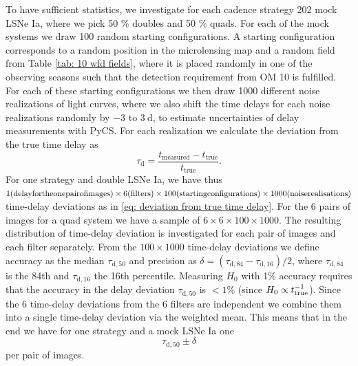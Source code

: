 To have sufficient statistics, we investigate for each cadence
strategy 202 mock LSNe Ia, where we pick 50 \% doubles and 50 \%
quads. For each of the mock systems we draw 100 random starting
configurations. A starting configuration corresponds to a random
position in the microlensing map and a random field from Table
\ref{tab: 10 wfd fields}, where it is placed randomly in one of the
observing seasons such that the detection requirement from OM 10 is
fulfilled. For each of these starting configurations we then draw 1000
different noise realizations of light curves, where we also shift the
time delays for each noise realizations randomly by $-3$ to
$\SI{3}{\day}$, to estimate uncertainties of delay measurements with
PyCS. For each realization we calculate the deviation from the true
time delay as
%
\begin{equation}
\tau_\mathrm{d} = \frac{t_\mathrm{measured} - t_\mathrm{true}}{t_\mathrm{true}}.
\label{eq: deviation from true time delay}
\end{equation}
For one strategy and double LSNe Ia, we have thus $1 {\rm (delay for the
one pair of images)} \times 6 {\rm (filters)} \times 100 {\rm
(starting configurations)} \times 1000 {\rm (noise realisations)}$
time-delay deviations as in \eqref{eq: deviation from true time delay}.
For the 6 pairs of images for a quad system we have a sample of $6
\times 6 \times 100 \times 1000$. The resulting distribution of
time-delay deviation is investigated for each pair of images and each
filter separately. From the $100 \times 1000$ time-delay deviations we
define accuracy as the median $\tau_\mathrm{d,50}$ and precision as
$\delta = (\tau_\mathrm{d,84}-\tau_\mathrm{d,16})/2$, where
$\tau_\mathrm{d,84}$ is the 84th and $\tau_\mathrm{d,16}$ the 16th
percentile. Measuring $H_0$ with 1\% accuracy requires that the accuracy
in the delay deviation $\tau_\mathrm{d,50}$ is $<1\%$ (since $H_0 \propto
t_{\rm true}^{-1}$). Since the 6 time-delay deviations from the 6 filters are independent we combine them into a single time-delay deviation via the weighted mean. This means that in the end we have for one strategy and a mock LSNe Ia one 
\begin{equation}
\tau_\mathrm{d,50} \pm \delta
\label{eq: accuracy and precission}
\end{equation}
per pair of images.


